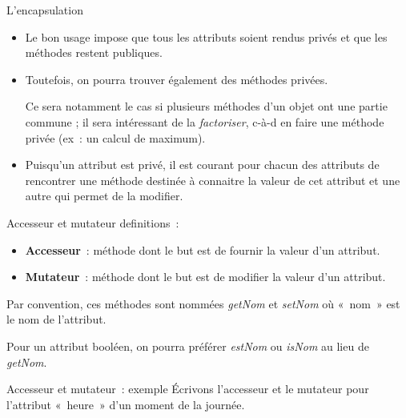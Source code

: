 \begin{frame}{L'encapsulation}
	\begin{itemize}
		\item
		Le bon usage impose que tous les attributs soient rendus privés 
		et que les méthodes restent publiques. 
		\item
		Toutefois, on pourra trouver également des méthodes privées. 
		
		Ce sera notamment le cas si plusieurs méthodes d'un objet 
		ont une partie commune ; 
		il sera intéressant de la \textit{factoriser}, 
		c-à-d en faire une méthode privée (ex~: un calcul de maximum).
		\item
		Puisqu'un attribut est privé,
		il est courant pour chacun des attributs de rencontrer 
		une méthode destinée à connaitre la valeur de cet attribut 
		et une autre qui permet de la modifier.
	\end{itemize}
\end{frame}

\begin{frame}{Accesseur et mutateur}
	{definitions~:}
	\begin{itemize}
		\item
		\textbf{Accesseur}~: méthode dont le but est de fournir la valeur d'un attribut.
		\item
		\textbf{Mutateur}~: méthode dont le but est de modifier la valeur d'un attribut.
	\end{itemize}
	
	Par convention, ces méthodes sont nommées \textit{getNom} et 
	\textit{setNom} où «~nom~» est le nom de l'attribut.
	
	Pour un attribut booléen, on pourra préférer \textit{estNom} ou \textit{isNom} 
	au lieu de \textit{getNom}. 
\end{frame}

\begin{frame}{Accesseur et mutateur~: exemple}
	Écrivons l'accesseur et le mutateur pour l'attribut 
	«~heure~» d'un moment de la journée.
	
	\bigskip

	
	\bigskip

\end{frame}

